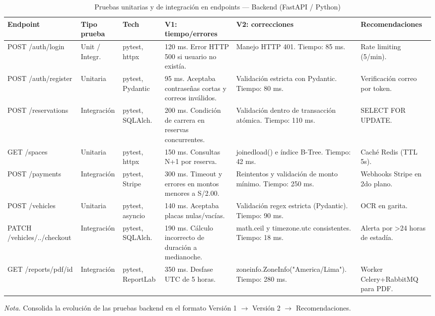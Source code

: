 \begin{table}[htbp]
\caption{Pruebas unitarias y de integración en endpoints — Backend (FastAPI / Python)}
\label{tab:pruebas_backend}
\begin{tabular}{@{}p{2.5cm} p{1.8cm} p{2.2cm} p{3.0cm} p{3.5cm} p{3cm}@{}}
\toprule
\textbf{Endpoint} & \textbf{Tipo prueba} & \textbf{Tech} & \textbf{V1: tiempo/errores} & \textbf{V2: correcciones} & \textbf{Recomendaciones} \\
\midrule
POST /auth/login & Unit / Integr. & pytest, httpx & 120 ms. Error HTTP 500 si usuario no existía. & Manejo HTTP 401. Tiempo: 85 ms. & Rate limiting (5/min). \\
POST /auth/register & Unitaria & pytest, Pydantic & 95 ms. Aceptaba contraseñas cortas y correos inválidos. & Validación estricta con Pydantic. Tiempo: 80 ms. & Verificación correo por token. \\
POST /reservations & Integración & pytest, SQLAlch. & 200 ms. Condición de carrera en reservas concurrentes. & Validación dentro de transacción atómica. Tiempo: 110 ms. & SELECT FOR UPDATE. \\
GET /spaces & Unitaria & pytest, httpx & 150 ms. Consultas N+1 por reserva. & joinedload() e índice B-Tree. Tiempo: 42 ms. & Caché Redis (TTL 5s). \\
POST /payments & Integración & pytest, Stripe & 300 ms. Timeout y errores en montos menores a S/2.00. & Reintentos y validación de monto mínimo. Tiempo: 250 ms. & Webhooks Stripe en 2do plano. \\
POST /vehicles & Unitaria & pytest, asyncio & 140 ms. Aceptaba placas nulas/vacías. & Validación regex estricta (Pydantic). Tiempo: 90 ms. & OCR en garita. \\
PATCH /vehicles/../checkout & Integración & pytest, SQLAlch. & 190 ms. Cálculo incorrecto de duración a medianoche. & math.ceil y timezone.utc consistentes. Tiempo: 18 ms. & Alerta por >24 horas de estadía. \\
GET /reports/pdf/id & Integración & pytest, ReportLab & 350 ms. Desfase UTC de 5 horas. & zoneinfo.ZoneInfo("America/Lima"). Tiempo: 280 ms. & Worker Celery+RabbitMQ para PDF. \\
\bottomrule
\end{tabular}
\par\vspace{0.2cm}
\textit{Nota.} Consolida la evolución de las pruebas backend en el formato Versión 1 $\rightarrow$ Versión 2 $\rightarrow$ Recomendaciones.
\end{table}

